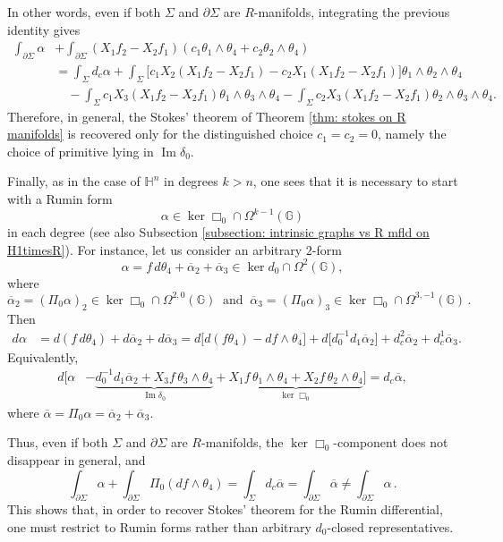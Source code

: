 \documentclass[dvipsnames]{amsart}
\theoremstyle{definition}
\theoremstyle{definition}
\numberwithin{equation}{section}
\newcommand{\G}{\mathbb{G}}
\renewcommand{\H}{\mathbb{H}}
\begin{document}
In other words, even if both \(\Sigma\) and \(\partial\Sigma\) are \(R\)-manifolds, integrating the previous identity gives
\begin{align*}
    \int_{\partial\Sigma}\alpha
    &+
    \int_{\partial\Sigma}(X_1f_2-X_2f_1)
    (c_1\theta_1\wedge\theta_4+c_2\theta_2\wedge\theta_4)\\
    &=
    \int_\Sigma d_c\alpha+
    \int_\Sigma
    \big[c_1X_2(X_1f_2-X_2f_1)
    -c_2X_1(X_1f_2-X_2f_1)\big]
    \theta_1\wedge\theta_2\wedge\theta_4\\
    &\quad-
    \int_{\Sigma}
    c_1X_3(X_1f_2-X_2f_1)
    \theta_1\wedge\theta_3\wedge\theta_4-
    \int_{\Sigma}
    c_2X_3(X_1f_2-X_2f_1)
    \theta_2\wedge\theta_3\wedge\theta_4 .
\end{align*}
Therefore, in general, the Stokes' theorem of Theorem \ref{thm: stokes on R manifolds} is recovered only for the distinguished choice \(c_1=c_2=0\), namely the choice of primitive lying in \(\operatorname{Im}\delta_0\).


Finally, as in the case of \(\H^n\) in degrees \(k>n\), one sees that it is necessary to start with a Rumin form
\[
\alpha\in\ker\Box_0\cap\Omega^{k-1}(\G)
\]
in each degree (see also Subsection \ref{subsection: intrinsic graphs vs R mfld on H1timesR}). For instance, let us consider an arbitrary \(2\)-form
\[
\alpha=f\,d\theta_4+\overline{\alpha}_2+\overline{\alpha}_3\in\ker d_0\cap\Omega^2(\G),
\]
where
\[
\overline{\alpha}_2=(\Pi_0\alpha)_2\in\ker\Box_0\cap\Omega^{2,0}(\G)\ \text{ and }\
\overline{\alpha}_3=(\Pi_0\alpha)_3\in\ker\Box_0\cap\Omega^{3,-1}(\G)\,.
\]
Then
\begin{align*}
    d\alpha
    &=
    d(f\,d\theta_4)+d\overline{\alpha}_2+d\overline{\alpha}_3=
    d\big[d(f\theta_4)-df\wedge\theta_4\big]
    +d\big[d_0^{-1}d_1\overline{\alpha}_2\big]
    +d_c^2\overline{\alpha}_2
    +d_c^1\overline{\alpha}_3 .
\end{align*}
Equivalently,
\begin{align*}
    d\Big[
    \alpha
    &-
    \underbrace{d_0^{-1}d_1\overline{\alpha}_2
    +X_3f\,\theta_3\wedge\theta_4}_{\operatorname{Im}\delta_0}
    +
    \underbrace{X_1f\,\theta_1\wedge\theta_4
    +X_2f\,\theta_2\wedge\theta_4}_{\ker\Box_0}
    \Big]
    =
    d_c\overline{\alpha},
\end{align*}
where \(\overline{\alpha}=\Pi_0\alpha=\overline{\alpha}_2+\overline{\alpha}_3\).

Thus, even if both \(\Sigma\) and \(\partial\Sigma\) are \(R\)-manifolds, the \(\ker\Box_0\)-component does not disappear in general, and
\[
    \int_{\partial\Sigma}\alpha
    +
    \int_{\partial\Sigma}\Pi_0(df\wedge\theta_4)
    =
    \int_\Sigma d_c\overline{\alpha}
    =
    \int_{\partial\Sigma}\overline{\alpha}
    \neq
    \int_{\partial\Sigma}\alpha \,.
\]
This shows that, in order to recover Stokes' theorem for the Rumin differential, one must restrict to Rumin forms rather than arbitrary \(d_0\)-closed representatives.
\end{document}

